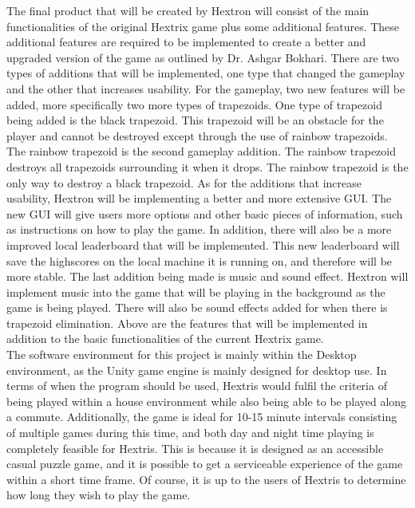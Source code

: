 \documentclass[12pt]{article}
\begin{document}
{\color{blue} The final product that will be created by Hextron will consist of the main functionalities of the original Hextrix game plus some additional features. These additional features are required to be implemented to create a better and upgraded version of the game as outlined by Dr. Ashgar Bokhari. There are two types of additions that will be implemented, one type that changed the gameplay and the other that increases usability. For the gameplay, two new features will be added, more specifically two more types of trapezoids. One type of trapezoid being added is the black trapezoid. This trapezoid will be an obstacle for the player and cannot be destroyed except through the use of rainbow trapezoids. The rainbow trapezoid is the second gameplay addition. The rainbow trapezoid destroys all trapezoids surrounding it when it drops. The rainbow trapezoid is the only way to destroy a black trapezoid. As for the additions that increase usability, Hextron will be implementing a better and more extensive GUI. The new GUI will give users more options and other basic pieces of information, such as instructions on how to play the game. In addition, there will also be a more improved local leaderboard that will be implemented. This new leaderboard will save the highscores on the local machine it is running on, and therefore will be more stable. The last addition being made is music and sound effect. Hextron will implement music into the game that will be playing in the background as the game is being played. There will also be sound effects added for when there is trapezoid elimination. Above are the features that will be implemented in addition to the basic functionalities of the current Hextrix game.} \\

The software environment for this project is mainly within the Desktop environment, as the Unity game engine is mainly designed for desktop use.  In terms of when the program should be used, Hextris would fulfil the criteria of being played within a house environment while also being able to be played along a commute. Additionally, the game is ideal for 10-15 minute intervals consisting of multiple games during this time, and both day and night time playing is completely feasible for Hextris. This is because it is designed as an accessible casual puzzle game, and it is possible to get a serviceable experience of the game within a short time frame. Of course, it is up to the users of Hextris to determine how long they wish to play the game.\\	
\end{document}
